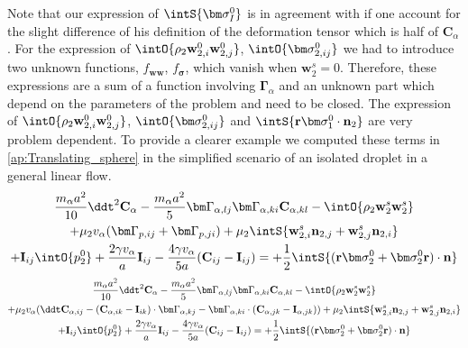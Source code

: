 Note that our expression of $\intS{\bm\sigma_I^0}$ is in agreement with \citet{lhuillier1987phenomenology} if one account for the slight difference of his definition of the deformation tensor which is half of $\textbf{C}_{\alpha}$. 
For the expression of $\intO{\rho_2 \textbf{w}_{2,i}^0\textbf{w}_{2,j}^0}$, $ \intO{\bm\sigma_{2,ij}^0}$ we had to introduce two unknown functions, $f_\textbf{ww}$, $f_{\bm{\sigma}}$, which vanish when $\textbf{w}^s_2 =0$. 
Therefore, these expressions are a sum of a function involving $\bm\Gamma_\alpha$ and an unknown part which depend on the parameters of the problem and need to be closed. 
The expression of $\intO{\rho_2 \textbf{w}_{2,i}^0\textbf{w}_{2,j}^0}$, $ \intO{\bm\sigma_{2,ij}^0}$ and $\intS{\textbf{r}\bm\sigma_1^0\cdot \textbf{n}_2}$ are very problem dependent. 
To provide a clearer example we computed these terms in \ref{ap:Translating_sphere} in the simplified scenario of an isolated droplet in a general linear flow. 
\begin{multline}    
    \frac{m_\alpha a^2}{10}\ddt^2 \textbf{C}_\alpha
    - \frac{m_\alpha a^2}{5}
    \bm\Gamma_{\alpha,lj}\bm\Gamma_{\alpha,ki} \textbf{C}_{\alpha,kl} 
    - \intO{\rho_2\textbf{w}^s_2\textbf{w}^s_2}\\
    + \mu_2 v_\alpha (\bm \Gamma_{p,ij}+\bm \Gamma_{p,ji})
    + \mu_2 \intS{\textbf{w}^s_{2,i}\textbf{n}_{2,j}+ \textbf{w}^s_{2,j}\textbf{n}_{2,i}}\\
    + \textbf{I}_{ij}\intO{p_2^0} 
    + \frac{2 \gamma v_\alpha }{a} \textbf{I}_{ij} 
    - \frac{4 \gamma v_\alpha }{5 a} (\textbf{C}_{ij} - \textbf{I}_{ij})
    =  
    + \frac{1}{2}\intS{(\textbf{r}\bm\sigma_2^0+ \bm\sigma_2^0\textbf{r})\cdot \textbf{n}}
\end{multline}
\begin{multline}    
    \frac{m_\alpha a^2}{10}\ddt^2 \textbf{C}_\alpha
    - \frac{m_\alpha a^2}{5}
    \bm\Gamma_{\alpha,lj}\bm\Gamma_{\alpha,ki} \textbf{C}_{\alpha,kl} 
    - \intO{\rho_2\textbf{w}^s_2\textbf{w}^s_2}\\
    + \mu_2 v_\alpha (
        \ddt \textbf{C}_{\alpha,ij}
         -(\textbf{C}_{\alpha,ik} - \textbf{I}_{ik}) \cdot \bm\Gamma_{\alpha,kj}
    -  \bm\Gamma_{\alpha,ki} \cdot (\textbf{C}_{\alpha,jk} - \textbf{I}_{\alpha,jk})
    )
    + \mu_2 \intS{\textbf{w}^s_{2,i}\textbf{n}_{2,j}+ \textbf{w}^s_{2,j}\textbf{n}_{2,i}}\\
    + \textbf{I}_{ij}\intO{p_2^0} 
    + \frac{2 \gamma v_\alpha }{a} \textbf{I}_{ij} 
    - \frac{4 \gamma v_\alpha }{5 a} (\textbf{C}_{ij} - \textbf{I}_{ij})
    =  
    + \frac{1}{2}\intS{(\textbf{r}\bm\sigma_2^0+ \bm\sigma_2^0\textbf{r})\cdot \textbf{n}}
\end{multline}
